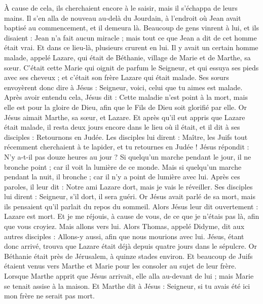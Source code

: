 \begin{multicols}{2}
À cause de cela, ils cherchaient encore à le saisir, mais il s'échappa de leurs mains.
Il s'en alla de nouveau au-delà du Jourdain, à l'endroit où Jean avait baptisé au commencement, et il demeura là.
Beaucoup de gens vinrent à lui, et ils disaient : Jean n'a fait aucun miracle ; mais tout ce que Jean a dit de cet homme était vrai.
Et dans ce lieu-là, plusieurs crurent en lui.
\VerseOne{}Il y avait un certain homme malade, appelé Lazare, qui était de Béthanie, village de Marie et de Marthe, sa sœur.
C'était cette Marie qui oignit de parfum le Seigneur, et qui essuya ses pieds avec ses cheveux ; et c'était son frère Lazare qui était malade.
Ses sœurs envoyèrent donc dire à Jésus : Seigneur, voici, celui que tu aimes est malade.
Après avoir entendu cela, Jésus dit : Cette maladie n'est point à la mort, mais elle est pour la gloire de Dieu, afin que le Fils de Dieu soit glorifié par elle.
Or Jésus aimait Marthe, sa sœur, et Lazare.
Et après qu'il eut appris que Lazare était malade, il resta deux jours encore dans le lieu où il était,
et il dit à ses disciples : Retournons en Judée.
Les disciples lui dirent : Maître, les Juifs tout récemment cherchaient à te lapider, et tu retournes en Judée !
Jésus répondit : N'y a-t-il pas douze heures au jour ? Si quelqu'un marche pendant le jour, il ne bronche point ; car il voit la lumière de ce monde.
Mais si quelqu'un marche pendant la nuit, il bronche ; car il n'y a point de lumière avec lui.
Après ces paroles, il leur dit : Notre ami Lazare dort, mais je vais le réveiller.
Ses disciples lui dirent : Seigneur, s'il dort, il sera guéri.
Or Jésus avait parlé de sa mort, mais ils pensaient qu'il parlait du repos du sommeil.
Alors Jésus leur dit ouvertement : Lazare est mort.
Et je me réjouis, à cause de vous, de ce que je n'étais pas là, afin que vous croyiez. Mais allons vers lui.
Alors Thomas, appelé Didyme, dit aux autres disciples : Allons-y aussi, afin que nous mourions avec lui.
Jésus, étant donc arrivé, trouva que Lazare était déjà depuis quatre jours dans le sépulcre.
Or Béthanie était près de Jérusalem, à quinze stades environ.
Et beaucoup de Juifs étaient venus vers Marthe et Marie pour les consoler au sujet de leur frère.
Lorsque Marthe apprit que Jésus arrivait, elle alla au-devant de lui ; mais Marie se tenait assise à la maison.
Et Marthe dit à Jésus : Seigneur, si tu avais été ici mon frère ne serait pas mort.

\end{multicols}

